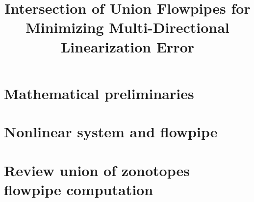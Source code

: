 


\title{Intersection of Union Flowpipes for Minimizing Multi-Directional Linearization Error}
\author{}
\institute{}
%
    
\maketitle

\section{Mathematical preliminaries}


\section{Nonlinear system and flowpipe}


\section{Review union of zonotopes flowpipe computation}






